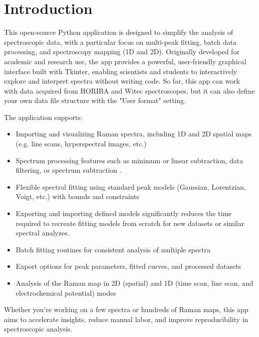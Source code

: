 \chapter{Introduction}
\label{cha:Introduction}


This open-source Python application is designed to simplify the analysis of spectroscopic data, with a particular focus on multi-peak fitting, batch data processing, and spectroscopy mapping (1D and 2D). Originally developed for academic and research use, the app provides a powerful, user-friendly graphical interface built with Tkinter, enabling scientists and students to interactively explore and interpret spectra without writing code. So far, this app can work with data acquired from HORIBA and Witec spectroscopes, but it can also define your own data file structure with the "User format" setting.

The application supports:
\begin{itemize}
    \item Importing and visualizing Raman spectra, including 1D and 2D spatial maps (e.g. line scans, hyperspectral images, etc.)
    \item Spectrum processing features such as minimum or linear subtraction, data filtering, or spectrum subtraction
.\item Flexible spectral fitting using standard peak models (Gaussian, Lorentzian, Voigt, etc.) with bounds and constraints
    \item Exporting and importing defined models significantly reduces the time required to recreate fitting models from scratch for new datasets or similar spectral analyzes.
    \item Batch fitting routines for consistent analysis of multiple spectra
    \item Export options for peak parameters, fitted curves, and processed datasets
    \item Analysis of the Raman map in 2D (spatial) and 1D (time scan, line scan, and electrochemical potential) modes
\end{itemize}

Whether you're working on a few spectra or hundreds of Raman maps, this app aims to accelerate insights, reduce manual labor, and improve reproducibility in spectroscopic analysis.